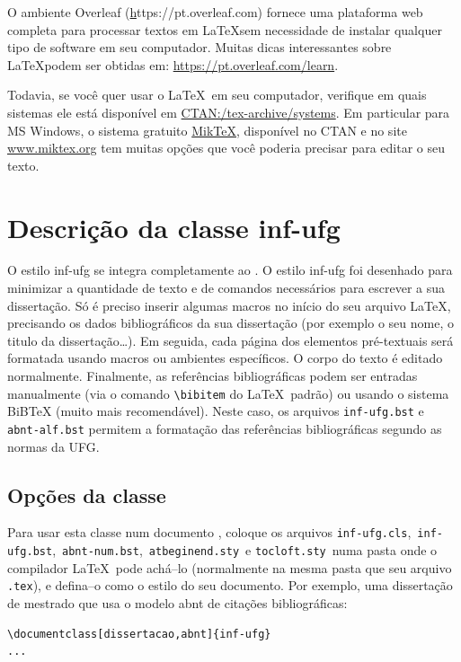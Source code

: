 O ambiente Overleaf (\href{https://pt.overleaf.com} https://pt.overleaf.com) fornece uma plataforma web completa para processar textos em \LaTeX sem necessidade de instalar qualquer tipo de software em seu computador. Muitas dicas interessantes sobre \LaTeX podem ser obtidas em: \href{https://pt.overleaf.com/learn}{https://pt.overleaf.com/learn}. 

Todavia, se você quer usar o \LaTeX\ em seu computador, verifique em quais sistemas ele está disponível em \href{http://www.ctan.org/tex-archive/systems/}{CTAN:/tex-archive/systems}. Em particular para \textsf{MS Windows}, o sistema gratuito \href{http://www.miktex.org/}{MikTeX}, disponível no CTAN e no site \href{http://www.miktex.org/}{www.miktex.org} tem muitas opções  que você poderia precisar para editar o seu texto.


\section{Descrição da classe \textsf{inf-ufg}}
\label{sec:descr}

O estilo \textsf{inf-ufg} se integra completamente ao \LaTeXe. %
O estilo \textsf{inf-ufg} foi desenhado para minimizar a quantidade de texto e de comandos necessários para escrever a sua dissertação. Só é preciso inserir algumas macros no início do seu arquivo \LaTeX, precisando os dados bibliográficos da sua dissertação (por exemplo o seu nome, o titulo da dissertação\ldots). 
Em seguida, cada página dos elementos pré-textuais será formatada usando macros ou ambientes específicos. O corpo do texto é editado normalmente. Finalmente, as referências bibliográficas podem ser entradas manualmente (via o comando \verb|\bibitem| do \LaTeX\ padrão) ou usando o sistema BiBTeX (muito mais recomendável). Neste caso, os arquivos \verb|inf-ufg.bst| e \verb|abnt-alf.bst| permitem a formatação das referências bibliográficas segundo as normas da UFG.

\subsection{Opções da classe}
\label{sec:opcoes}
Para usar esta classe num documento \LaTeXe, coloque os arquivos 
\verb|inf-ufg.cls|,\ \verb|inf-ufg.bst|,\ \verb|abnt-num.bst|,\ \verb|atbeginend.sty|\ e \verb|tocloft.sty|\ numa pasta onde o compilador \LaTeX\ pode achá--lo (normalmente na mesma pasta que seu arquivo \verb|.tex|), e defina--o como o estilo do seu documento. Por exemplo, uma dissertação de mestrado que usa o modelo abnt de citações bibliográficas:
\begin{verbatim}
\documentclass[dissertacao,abnt]{inf-ufg}
...

\end{verbatim}

